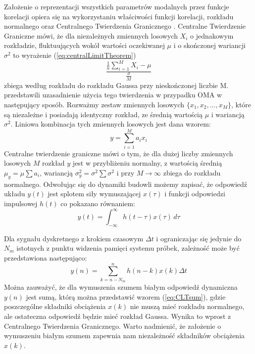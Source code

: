 Założenie o reprezentacji wszystkich parametrów modalnych przez funkcje korelacji opiera się na wykorzystaniu właściwości funkcji korelacji, rozkładu normalnego oraz Centralnego Twierdzenia Granicznego . Centralne Twierdzenie Graniczne mówi, że dla niezależnych zmiennych losowych $X_i$ o jednakowym rozkładzie, fluktuujących wokół wartości oczekiwanej $\mu$ i o skończonej wariancji $\sigma^2$ to wyrażenie (\ref{eq:centralLimitTheorem})
\begin{equation} \label{eq:centralLimitTheorem}
	\frac{\frac{1}{n}\sum_{i=1}^{M} X_i - \mu}{\frac{\sigma}{M}}
\end{equation}
zbiega według rozkładu do rozkładu Gaussa przy nieskończonej liczbie M.
\cite{Brincker2015} przedstawili uzasadnienie użycia tego twierdzenia w przypadku OMA w następujący sposób. Rozważmy zestaw zmiennych losowych $\{x_1,x_2,...,x_M\}$, które są niezależne i posiadają identyczny rozkład, ze średnią wartością $\mu$ i wariancją $\sigma^2$. Liniowa kombinacja tych zmiennych losowych jest dana wzorem:
\begin{equation} \label{eq:CLTsum}
	y = \sum_{i=1}^{M} a_i x_i
\end{equation}
 Centralne twierdzenie graniczne mówi o tym, że dla dużej liczby zmiennych losowych $M$ rozkład $y$ jest w przybliżeniu normalny, z wartością średnią $\mu_y=\mu\sum a_i$, wariancją $\sigma_y^2=\sigma^2\sum \sigma^2$ i przy $M \xrightarrow{} \infty$ zbiega do rozkładu normalnego. Odwołując się do dynamiki budowli możemy zapisać, że odpowiedź układu $y(t)$ jest splotem siły wymuszającej $x(\tau)$ i funkcji odpowiedzi impulsowej $h(t)$ co pokazano równaniem:
 \begin{equation} \label{eq:convolutionResponse}
 	y(t)=\int_{-\infty}^{\infty}h(t-\tau)x(\tau) \,d\tau
 \end{equation}
 
  Dla sygnału dyskretnego z krokiem czasowym $\Delta t$ i ograniczając się jedynie do $N_m$ istotnych z punktu widzenia pamięci systemu próbek, zależność może być przedstawiona następująco:
 \begin{equation}
 	y(n) = \sum_{k=n-N_m}^{n} h(n-k)x(k)\Delta t
 \end{equation}
Można zauważyć, że dla wymuszenia szumem białym odpowiedź dynamiczna $y(n)$ jest sumą, którą można przedstawić wzorem (\ref{eq:CLTsum}), gdzie poszczególne składniki obciążenia $x(k)$ nie muszą mieć rozkładu normalnego, ale ostateczna odpowiedź będzie mieć rozkład Gaussa. Wynika to wprost z Centralnego Twierdzenia Granicznego. Warto nadmienić, że założenie o wymuszeniu białym szumem zapewnia nam niezależność składników obciążenia $x(k)$. 

